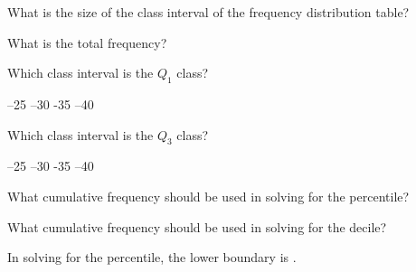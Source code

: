 \begin{questions}
\question What is the size of the class interval of the frequency distribution table? 
\begin{multicols}{4}
\begin{choices} 
\end{choices}
\end{multicols}

\question What is the total frequency? 
\begin{multicols}{4}
\begin{choices} 
\end{choices}
\end{multicols}

\question Which class interval is the $Q_1$ class? 
\begin{multicols}{4}
\begin{choices} 
--25
--30
-35
--40
\end{choices}
\end{multicols}

\question Which class interval is the $Q_3$ class? 
\begin{multicols}{4}
\begin{choices} 
--25
--30
-35
--40
\end{choices}
\end{multicols}

\question What cumulative frequency should be used in solving for the  percentile? 
\begin{multicols}{4}
\begin{choices} 
\end{choices}
\end{multicols}

\question What cumulative frequency should be used in solving for the  decile? 
\begin{multicols}{4}
\begin{choices} 
\end{choices}
\end{multicols}

\question In solving for the  percentile, the lower boundary is \blank.
\begin{multicols}{4}
\begin{choices} 
\end{choices}
\end{multicols}


\end{questions}
